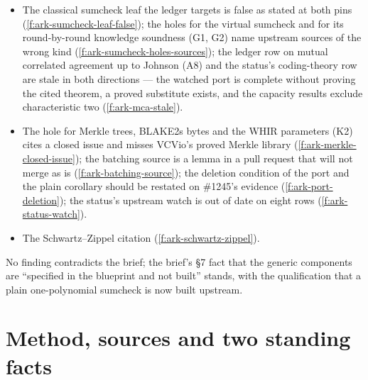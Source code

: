 \begin{itemize}
\item {} The classical sumcheck leaf the ledger targets is false as stated at both pins
  (\cref{f:ark-sumcheck-leaf-false}); the holes for the virtual sumcheck and for its
  round-by-round knowledge soundness (G1, G2) name upstream sources of the wrong kind
  (\cref{f:ark-sumcheck-holes-sources}); the ledger row on mutual correlated agreement up to
  Johnson (A8) and the status's coding-theory row are stale in both directions --- the watched
  port is complete without proving the cited theorem, a proved substitute exists, and the
  capacity results exclude characteristic two (\cref{f:ark-mca-stale}).
\item {} The hole for Merkle trees, BLAKE2s bytes and the WHIR parameters (K2) cites a
  closed issue and misses VCVio's proved Merkle library (\cref{f:ark-merkle-closed-issue}); the
  batching source is a lemma in a pull request that will not merge as is
  (\cref{f:ark-batching-source}); the deletion condition of the port and the plain corollary
  should be restated on \#1245's evidence (\cref{f:ark-port-deletion}); the status's upstream
  watch is out of date on eight rows (\cref{f:ark-status-watch}).
\item {} The Schwartz--Zippel citation (\cref{f:ark-schwartz-zippel}).
\end{itemize}
No finding contradicts the brief; the brief's §7 fact that the generic components are
``specified in the blueprint and not built'' stands, with the qualification that a plain
one-polynomial sumcheck is now built upstream.

\section{Method, sources and two standing facts}\label{sec:ark-method}

